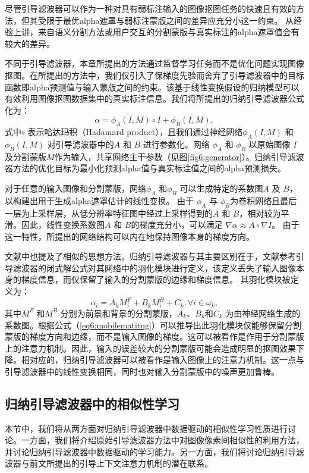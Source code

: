 尽管引导滤波器可以作为一种对具有弱标注输入的图像抠图任务的快速且有效的方法，但其受限于最优alpha遮罩与弱标注蒙版之间的差异应充分小这一约束。 从经验上讲，来自语义分割方法或用户交互的分割蒙版与真实标注的alpha遮罩值会有较大的差异。

不同于引导滤波器，本章所提出的方法通过监督学习任务而不是优化问题实现图像抠图。在所提出的方法中，我们仅引入了保梯度先验而舍弃了引导滤波器中的目标函数即alpha预测值与输入蒙版之间的约束。该基于线性变换假设的归纳模型可以有效利用图像抠图数据集中的真实标注信息。我们将所提出的归纳引导滤波器公式化为：
\begin{equation}
\alpha = \phi_{A}(I, M)\circ I + \phi_{B}(I, M), 
\label{eq6:igf}
\end{equation}
式中$ \circ $ 表示哈达玛积（Hadamard product），且我们通过神经网络$ \phi_{A}(I, M) $ 和 $ \phi_{B}(I, M) $ 对引导滤波器中的$ A $ 和 $ B $ 进行参数化。网络 $ \phi_{A} $ 和 $ \phi_{B} $ 以原始图像 $ I $ 及分割蒙版$ M $作为输入，共享网络主干参数（见图\ref{fig6:generator}）。归纳引导滤波器方法的优化目标为最小化预测alpha值与真实标注值之间的alpha预测损失。

对于任意的输入图像和分割蒙版，网络$ \phi_{A} $ 和$ \phi_{B} $ 可以生成特定的系数图$ A $ 及 $ B $，以构建出用于生成alpha遮罩估计的线性变换。 
由于 $ \phi_{A} $ 与 $ \phi_{B} $为卷积网络且最后一层为上采样层，从低分辨率特征图中经过上采样得到的$ A $ 和 $ B $，相对较为平滑。因此，线性变换系数图$ A $ 和 $ B $的梯度充分小，可以满足 $ \nabla \alpha \approx A \circ \nabla I $。
由于这一特性，所提出的网络结构可以内在地保持图像本身的梯度方向。

文献\parencite{zhu2017fast}中也提及了相似的思想方法。归纳引导滤波器与其主要区别在于，文献\parencite{zhu2017fast}参考引导滤波器的闭式解公式对其网络中的羽化模块进行定义，该定义丢失了输入图像本身的梯度信息，而仅保留了输入的分割蒙版的边缘和梯度信息。
其羽化模块被定义为：
\begin{equation}
\alpha_i = A_k M^F_i + B_k M^B_i + C_k, \forall i \in \omega_k,
\label{eq6:mobilematitng}
\end{equation}
其中$ M^F $ 和$M^B$ 分别为前景和背景的分割蒙版，$ A_k$、$B_k $和$ C_k $ 为由神经网络生成的系数图。根据公式（\ref{eq6:mobilematitng}）可以推导出此羽化模块仅能够保留分割蒙版的梯度方向和边缘，而不是输入图像的梯度。这可以被看作是作用于分割蒙版上的注意力机制。因此，输入的误差较大的分割蒙版可能会造成明显的抠图效果下降。相对应的，归纳引导滤波器可以被看作是输入图像上的注意力机制。这一点与引导滤波器中的线性变换相同，同时也对输入分割蒙版中的噪声更加鲁棒。

\subsection{归纳引导滤波器中的相似性学习}
本节中，我们将从两方面对归纳引导滤波器中数据驱动的相似性学习性质进行讨论。一方面，我们将介绍原始引导滤波器方法中对图像像素间相似性的利用方法，并讨论归纳引导滤波器中数据驱动的学习能力。另一方面，我们将讨论归纳引导滤波器与前文所提出的引导上下文注意力机制的潜在联系。

